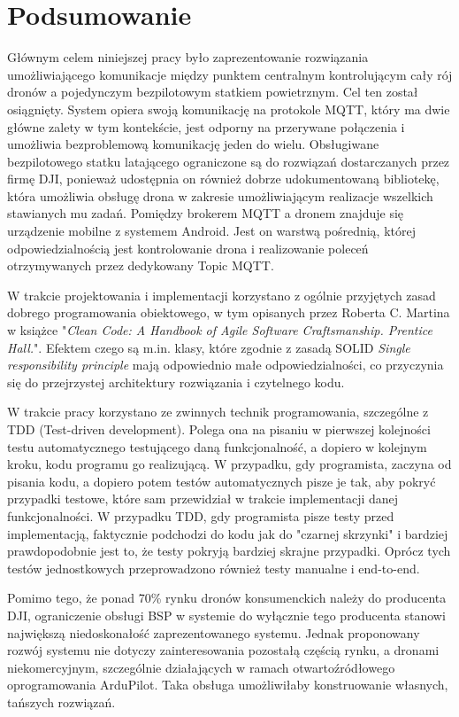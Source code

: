 \clearpage \section*{Podsumowanie} 

Głównym celem niniejszej pracy było zaprezentowanie rozwiązania umożliwiającego komunikacje między punktem centralnym kontrolującym cały rój dronów a pojedynczym bezpilotowym statkiem powietrznym. Cel ten został osiągnięty. System opiera swoją komunikację na protokole MQTT, który ma dwie główne zalety w tym kontekście, jest odporny na przerywane połączenia i umożliwia bezproblemową komunikację jeden do wielu. Obsługiwane bezpilotowego statku latającego ograniczone są do rozwiązań dostarczanych przez firmę DJI, ponieważ udostępnia on również dobrze udokumentowaną bibliotekę, która umożliwia obsługę drona w zakresie umożliwiającym realizacje wszelkich stawianych mu zadań. Pomiędzy brokerem MQTT a dronem znajduje się urządzenie mobilne z systemem Android. Jest on warstwą pośrednią, której odpowiedzialnością jest kontrolowanie drona i realizowanie poleceń otrzymywanych przez dedykowany Topic MQTT.

W trakcie projektowania i implementacji korzystano z ogólnie przyjętych zasad dobrego programowania obiektowego, w tym opisanych przez Roberta C. Martina w książce "\textit{Clean Code: A Handbook of Agile Software Craftsmanship. Prentice Hall.}". Efektem czego są m.in. klasy, które zgodnie z zasadą SOLID \textit{Single responsibility principle} mają odpowiednio małe odpowiedzialności, co przyczynia się do przejrzystej architektury rozwiązania i czytelnego kodu. \cite{solid}\cite{clean-code}

W trakcie pracy korzystano ze zwinnych technik programowania, szczególne z TDD (Test-driven development). Polega ona na pisaniu w pierwszej kolejności testu automatycznego testującego daną funkcjonalność, a dopiero w kolejnym kroku, kodu programu go realizującą. W przypadku, gdy programista, zaczyna od pisania kodu, a dopiero potem testów automatycznych pisze je tak, aby pokryć przypadki testowe, które sam przewidział w trakcie implementacji danej funkcjonalności. W przypadku TDD, gdy programista pisze testy przed implementacją, faktycznie podchodzi do kodu jak do "czarnej skrzynki" i bardziej prawdopodobnie jest to, że testy pokryją bardziej skrajne przypadki. Oprócz tych testów jednostkowych przeprowadzono również testy manualne i end-to-end.

Pomimo tego, że ponad 70\% rynku dronów konsumenckich należy do producenta DJI, ograniczenie obsługi BSP w systemie do wyłącznie tego producenta stanowi największą niedoskonałość zaprezentowanego systemu. Jednak proponowany rozwój systemu nie dotyczy zainteresowania pozostałą częścią rynku, a dronami niekomercyjnym, szczególnie działających w ramach otwartoźródłowego oprogramowania ArduPilot. Taka obsługa umożliwiłaby konstruowanie własnych, tańszych rozwiązań.

